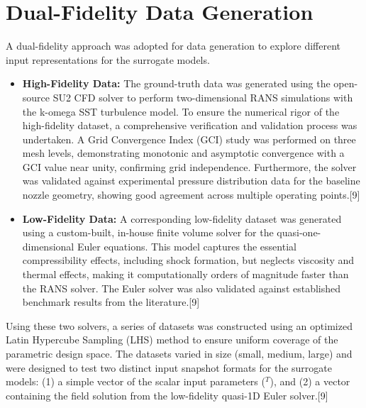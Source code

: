\documentclass[12pt, a4paper]{report}
\begin{document}
\section{Dual-Fidelity Data Generation}
A dual-fidelity approach was adopted for data generation to explore different input representations for the surrogate models.
\begin{itemize}
    \item \textbf{High-Fidelity Data:} The ground-truth data was generated using the open-source SU2 CFD solver to perform two-dimensional RANS simulations with the k-omega SST turbulence model. To ensure the numerical rigor of the high-fidelity dataset, a comprehensive verification and validation process was undertaken. A Grid Convergence Index (GCI) study was performed on three mesh levels, demonstrating monotonic and asymptotic convergence with a GCI value near unity, confirming grid independence. Furthermore, the solver was validated against experimental pressure distribution data for the baseline nozzle geometry, showing good agreement across multiple operating points.[9]
    \item \textbf{Low-Fidelity Data:} A corresponding low-fidelity dataset was generated using a custom-built, in-house finite volume solver for the quasi-one-dimensional Euler equations. This model captures the essential compressibility effects, including shock formation, but neglects viscosity and thermal effects, making it computationally orders of magnitude faster than the RANS solver. The Euler solver was also validated against established benchmark results from the literature.[9]
\end{itemize}
Using these two solvers, a series of datasets was constructed using an optimized Latin Hypercube Sampling (LHS) method to ensure uniform coverage of the parametric design space. The datasets varied in size (small, medium, large) and were designed to test two distinct input snapshot formats for the surrogate models: (1) a simple vector of the scalar input parameters ($^T$), and (2) a vector containing the field solution from the low-fidelity quasi-1D Euler solver.[9]
\end{document}
